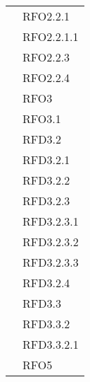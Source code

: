 \begin{longtable}{|>{\centering}m{10cm}|m{3cm}<{\centering}|}
& RFO2.2.1\\
& RFO2.2.1.1\\
& RFO2.2.3\\
& RFO2.2.4\\
& RFO3\\
& RFO3.1\\
& RFD3.2\\
& RFD3.2.1\\
& RFD3.2.2\\
& RFD3.2.3\\
& RFD3.2.3.1\\
& RFD3.2.3.2\\
& RFD3.2.3.3\\
& RFD3.2.4\\
& RFD3.3\\
& RFD3.3.2\\
& RFD3.3.2.1\\
& RFO5\\ \hline


\end{longtable}
